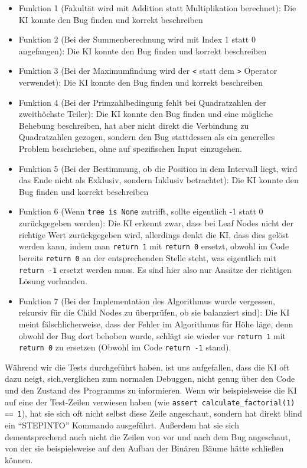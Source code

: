 \documentclass[a4paper,12pt,ngerman]{scrartcl}
\begin{document}
\begin{itemize}
	\item Funktion 1 (Fakultät wird mit Addition statt Multiplikation berechnet): Die KI konnte den Bug finden und korrekt beschreiben
	\item Funktion 2 (Bei der Summenberechnung wird mit Index 1 statt 0 angefangen): Die KI konnte den Bug finden und korrekt beschreiben
	\item Funktion 3 (Bei der Maximumfindung wird der \texttt{<} statt dem \texttt{>} Operator verwendet): Die KI konnte den Bug finden und korrekt beschreiben
	\item Funktion 4 (Bei der Primzahlbedingung fehlt bei Quadratzahlen der zweithöchste Teiler): Die KI konnte den Bug finden und eine mögliche Behebung beschreiben, hat aber nicht direkt die Verbindung zu Quadratzahlen gezogen, sondern den Bug stattdessen als ein generelles Problem beschrieben, ohne auf spezifischen Input einzugehen.
	\item Funktion 5 (Bei der Bestimmung, ob die Position in dem Intervall liegt, wird das Ende nicht als Exklusiv, sondern Inklusiv betrachtet): Die KI konnte den Bug finden und korrekt beschreiben
	\item Funktion 6 (Wenn \texttt{tree is None} zutrifft, sollte eigentlich -1 statt 0 zurückgegeben werden): Die KI erkennt zwar, dass bei Leaf Nodes nicht der richtige Wert zurückgegeben wird, allerdings denkt die KI, dass dies gelöst werden kann, indem man \texttt{return 1} mit \texttt{return 0} ersetzt, obwohl im Code bereits \texttt{return 0} an der entsprechenden Stelle steht, was eigentlich mit \texttt{return -1} ersetzt werden muss. Es sind hier also nur Ansätze der richtigen Lösung vorhanden.
	\item Funktion 7 (Bei der Implementation des Algorithmus wurde vergessen, rekursiv für die Child Nodes zu überprüfen, ob sie balanziert sind): Die KI meint fälschlicherweise, dass der Fehler im Algorithmus für Höhe läge, denn obwohl der Bug dort behoben wurde, schlägt sie wieder vor \texttt{return 1} mit \texttt{return 0} zu ersetzen (Obwohl im Code \texttt{return -1} stand).
\end{itemize}

Während wir die Tests durchgeführt haben, ist uns aufgefallen, dass die KI oft dazu neigt, sich,verglichen zum normalen Debuggen, nicht genug über den Code und den Zustand des Programms zu informieren. Wenn wir beispielsweise die KI auf eine der Test-Zeilen verwiesen haben (wie \texttt{assert calculate\_factorial(1) == 1}), hat sie sich oft nicht selbst diese Zeile angeschaut, sondern hat direkt blind ein ``STEPINTO'' Kommando ausgeführt. Außerdem hat sie sich dementsprechend auch nicht die Zeilen von vor und nach dem Bug angeschaut, von der sie beispielsweise auf den Aufbau der Binären Bäume hätte schließen können.
\end{document}
